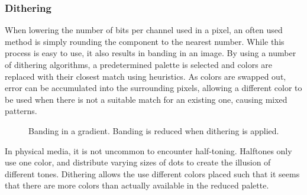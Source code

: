 \documentclass[12pt]{article}
\begin{document}
\subsubsection{Dithering}
When lowering the number of bits per channel used in a pixel, an often used method is simply rounding the component to the nearest number. While this process is easy to use, it also results in banding in an image. By using a number of dithering algorithms, a predetermined palette is selected and colors are replaced with their closest match using heuristics. As colors are swapped out, error can be accumulated into the surrounding pixels, allowing a different color to be used when there is not a suitable match for an existing one, causing mixed patterns.

\begin{figure}[!htbp]
\begin{center}
\caption{Banding in a gradient. Banding is reduced when dithering is applied.}
\end{center}
\end{figure}

In physical media, it is not uncommon to encounter half-toning. Halftones only use one color, and distribute varying sizes of dots to create the illusion of different tones. Dithering allows the use different colors placed such that it seems that there are more colors than actually available in the reduced palette. \citep{Knuth}
\end{document}

